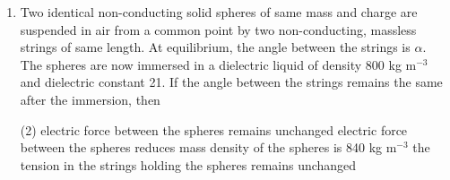 
\begin{enumerate}
    \item Two identical non-conducting solid spheres of same mass and charge are suspended in air from a common point by two non-conducting, massless strings of same length. At equilibrium, the angle between the strings is \(\alpha\). The spheres are now immersed in a dielectric liquid of density 800 kg m\(^{-3}\) and dielectric constant 21. If the angle between the strings remains the same after the immersion, then
        \begin{tasks}(2)
            \task electric force between the spheres remains unchanged
            \task electric force between the spheres reduces
            \task mass density of the spheres is 840 kg m\(^{-3}\)
            \task the tension in the strings holding the spheres remains unchanged
        \end{tasks}
\end{enumerate}
